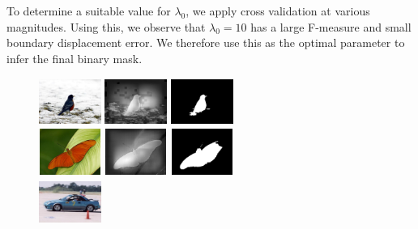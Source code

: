 \documentclass[10pt,twocolumn,letterpaper]{article}
\begin{document}
To determine a suitable value for $\lambda_0$, we apply cross validation at various magnitudes.  Using this, we observe that $\lambda_0 = 10$ has a large F-measure and small boundary displacement error.  We therefore use this as the optimal parameter to infer the final binary mask.


\begin{figure}[ht]
\begin{center}
    \includegraphics[width=0.8in,height=0.6in]{./Figures/CRFinference/5_159_159364.jpg}
    \includegraphics[width=0.8in,height=0.6in]{./Figures/CRFinference/5_159_159364_3.jpg}
    \includegraphics[width=0.8in,height=0.6in]{./Figures/CRFinference/5_159_159364_2.jpg} \\
    \includegraphics[width=0.8in,height=0.6in]{./Figures/CRFinference/5_159_159649.jpg}
    \includegraphics[width=0.8in,height=0.6in]{./Figures/CRFinference/5_159_159649_3.jpg}
    \includegraphics[width=0.8in,height=0.6in]{./Figures/CRFinference/5_159_159649_2.jpg} \\
    \includegraphics[width=0.8in,height=0.6in]{./Figures/CRFinference/5_162_162349.jpg}

\end{center}
\end{figure}
\end{document}
